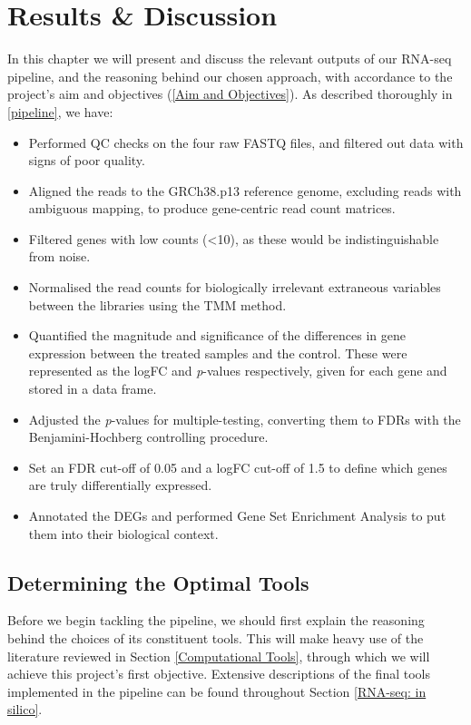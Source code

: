 \chapter{Results \& Discussion}

In this chapter we will present and discuss the relevant outputs of our RNA-seq pipeline, and the reasoning behind our chosen approach, with accordance to the project's aim and objectives (\autoref{Aim and Objectives}). As described thoroughly in \autoref{pipeline}, we have:

\begin{itemize}
\item Performed QC checks on the four raw FASTQ files, and filtered out data with signs of poor quality.
\item Aligned the reads to the GRCh38.p13 reference genome, excluding reads with ambiguous mapping, to produce gene-centric read count matrices.
\item Filtered genes with low counts (<10), as these would be indistinguishable from noise.
\item Normalised the read counts for biologically irrelevant extraneous variables between the libraries using the \ac{TMM} method.
\item Quantified the magnitude and significance of the differences in gene expression between the treated samples and the control. These were represented as the \ac{logFC} and \textit{p}-values respectively, given for each gene and stored in a data frame.
\item Adjusted the \textit{p}-values for multiple-testing, converting them to \ac{FDR}s with the Benjamini-Hochberg controlling procedure.
\item Set an \ac{FDR} cut-off of 0.05 and a \ac{logFC} cut-off of 1.5 to define which genes are truly differentially expressed.
\item Annotated the \ac{DEG}s and performed Gene Set Enrichment Analysis to put them into their biological context.
\end{itemize}


\section{Determining the Optimal Tools}
\label{determining tools}

Before we begin tackling the pipeline, we should first explain the reasoning behind the choices of its constituent tools. This will make heavy use of the literature reviewed in Section \ref{Computational Tools}, through which we will achieve this project's first objective. Extensive descriptions of the final tools implemented in the pipeline can be found throughout Section \ref{RNA-seq: in silico}.

